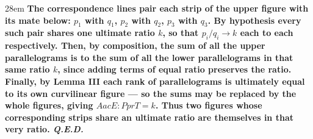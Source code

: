 \documentclass[border=4pt]{standalone}
\begin{document}
\begin{varwidth}{28em}
\large\bfseries
The \textcolor{corrorange}{correspondence lines} pair each strip of the upper figure with its mate below: $p_1$ with $q_1$, $p_2$ with $q_2$, $p_3$ with $q_3$. By hypothesis every such pair shares one ultimate ratio $k$, so that $p_i / q_i \to k$ each to each respectively. Then, by composition, the sum of \textcolor{figaviolet}{all the upper parallelograms} is to the sum of \textcolor{figbteal}{all the lower parallelograms} in that same ratio $k$, since adding terms of equal ratio preserves the ratio. Finally, by Lemma III each rank of parallelograms is ultimately equal to its own curvilinear figure --- so the sums may be replaced by the whole figures, giving $AacE : PprT = k$. Thus two figures whose corresponding strips share an ultimate ratio are themselves in that very ratio. \textit{Q.E.D.}
\end{varwidth}
\end{document}
